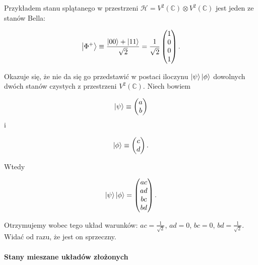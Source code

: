 \begin{example}
    Przykładem stanu splątanego w przestrzeni $\mathcal{H} = V ^ 2(\mathbb{C}) \otimes V ^ 2(\mathbb{C})$ jest jeden ze stanów Bella:

    \begin{equation}
        \label{equation:bellstate}
        \ket{\Phi ^ {+}} \equiv \frac{\ket{00} + \ket{11}}{\sqrt{2}} = \frac{1}{\sqrt{2}}
        \begin{pmatrix}
            1 \\
            0 \\
            0 \\
            1
        \end{pmatrix}.
    \end{equation}

    Okazuje się, że nie da się go przedstawić w postaci iloczynu $\ket{\psi} \ket{\phi}$ dowolnych dwóch stanów czystych z przestrzeni $V ^ 2(\mathbb{C})$. Niech bowiem

    $$
        \ket{\psi} \equiv
        \begin{pmatrix}
            a \\
            b \\
        \end{pmatrix}
    $$
    i

    $$
        \ket{\phi} \equiv
        \begin{pmatrix}
            c \\
            d \\
        \end{pmatrix}.
    $$

    Wtedy

    $$
        \ket{\psi} \ket{\phi} =
        \begin{pmatrix}
            ac \\
            ad \\
            bc \\
            bd \\
        \end{pmatrix}.
    $$

    Otrzymujemy wobec tego układ warunków: $ac = \frac{1}{\sqrt{2}}$, $ad = 0$, $bc = 0$, $bd = \frac{1}{\sqrt{2}}$. Widać od razu, że jest on sprzeczny.
\end{example}

\paragraph{Stany mieszane układów złożonych}

